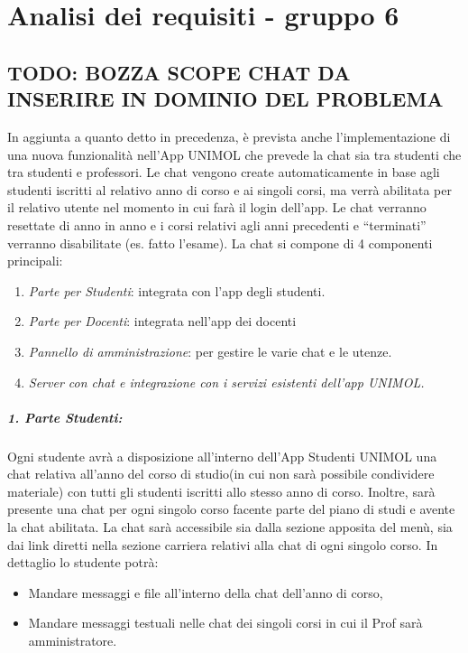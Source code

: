 
\chapter{Analisi dei requisiti - gruppo 6}
\label{ref:requisiti6}


\section{TODO: BOZZA SCOPE CHAT DA INSERIRE IN DOMINIO DEL PROBLEMA}
In aggiunta a quanto detto in precedenza, è prevista anche l'implementazione di una nuova funzionalità nell’App UNIMOL che prevede la chat sia tra studenti che tra studenti e professori.
Le chat vengono create automaticamente in base agli studenti iscritti al relativo anno di corso e ai singoli corsi, ma verrà abilitata per il relativo utente nel momento in cui farà il login dell’app.
Le chat verranno resettate di anno in anno e i corsi relativi agli anni precedenti e “terminati” verranno disabilitate (es. fatto l’esame).\newline
La chat si compone di 4 componenti principali:
\begin{enumerate}
\item \textit{Parte per Studenti}: integrata con l’app degli studenti.
\item \textit{Parte per Docenti}: integrata nell’app dei docenti
\item \textit{Pannello di amministrazione}: per gestire le varie chat e le utenze.
\item \textit{Server con chat e integrazione con i servizi esistenti dell’app UNIMOL.}
\end{enumerate}
\paragraph{1. Parte Studenti:\newline}
Ogni studente avrà a disposizione all’interno dell’App Studenti UNIMOL una chat relativa all’anno del corso di studio(in cui non sarà possibile condividere materiale) con tutti gli studenti iscritti allo stesso anno di corso. Inoltre, sarà presente una chat per ogni singolo corso facente parte del piano di studi e avente la chat abilitata.
La chat sarà accessibile sia dalla sezione apposita del menù, sia dai link diretti nella sezione carriera relativi alla chat di ogni singolo corso.
In dettaglio lo studente potrà:
\begin{itemize}
\item  Mandare messaggi e file all’interno della chat dell’anno di corso,
\item Mandare messaggi testuali nelle chat dei singoli corsi in cui il Prof sarà amministratore.
\end{itemize}


